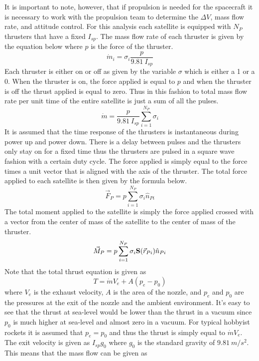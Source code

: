 It is important to note, however, that if propulsion is needed for the
spacecraft it is necessary to work with the propulsion team to
determine the $\Delta V$,  mass flow rate, and attitude control. For
this analysis each satellite is equipped with $N_P$ thrusters that have a fixed
$I_{sp}$. The mass flow rate of each thruster is given by the equation
below where $p$ is the force of the thruster.
\begin{equation}
  \dot{m}_i = \sigma_i\frac{p}{9.81~I_{sp}}
\end{equation}
Each thruster is either on or off as given by the variable $\sigma$
which is either a 1 or a 0. When the thruster is on, the force
applied is equal to $p$ and when the thruster is off the thrust
applied is equal to zero. Thus in this fashion to total mass flow rate
per unit time of the entire satellite is just a sum of all the pulses.
\begin{equation}
  \dot{m} = \frac{p}{9.81~I_{sp}}\sum\limits_{i=1}^{N_P}\sigma_i
\end{equation}
It is assumed that the time response of the
thrusters is instantaneous during power up and power down. There is a
delay between pulses and the thrusters only stay on for a fixed time
thus the thrusters are pulsed in a square wave fashion with a certain
duty cycle. The force applied is simply equal to the force times a
unit vector that is aligned with the axis of the thruster. The total
force applied to each satellite is then given by the formula below.
\begin{equation}
  \vec{F}_P = p\sum\limits_{i=1}^{N_P}\sigma_i\hat{n}_{Pi}
\end{equation}
The total moment applied to the satellite is simply the force applied
crossed with a vector from the center of mass of the satellite to the
center of mass of the thruster.
\begin{equation}\label{e:propulsion}
  \vec{M}_P = p\sum\limits_{i=1}^{N_P}\sigma_i{\bf S}(\vec{r}_{Pi})\hat{n}_{Pi}
\end{equation}
Note that the total thrust equation is given as 
\begin{equation}
  T = \dot{m}V_e + A(p_e - p_0)
\end{equation}
where $V_e$ is the exhaust velocity, $A$ is the area of the nozzle, and $p_e$ and $p_0$ are the pressures at the exit of the nozzle and the ambient environment. It's easy to see that the thrust at sea-level would be lower than the thrust in a vacuum since $p_0$ is much higher at sea-level and almost zero in a vacuum. For typical hobbyist rockets it is assumed that $p_e = p_0$ and thus the thrust is simply equal to $\dot{m}V_e$. The exit velocity is given as $I_{sp}g_0$ where $g_0$ is the standard gravity of $9.81~m/s^2$. This means that the mass flow can be given as 
